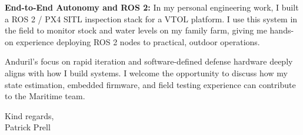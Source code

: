 \documentclass[localFont,alternative]{documentMETADATA}
\begin{document}
	\textbf{End-to-End Autonomy and ROS 2:} In my personal engineering work, I built a ROS 2 / PX4 SITL inspection stack for
	a VTOL platform. I use this system in the field to monitor stock and water levels on my family farm, giving me
	hands-on experience deploying ROS 2 nodes to practical, outdoor operations.

	Anduril's focus on rapid iteration and software-defined defense hardware deeply aligns with how I build systems.
	I welcome the opportunity to discuss how my state estimation, embedded firmware, and field testing experience can
	contribute to the Maritime team.

	\vspace{0.6em}

	Kind regards,\\[0.4em]
	Patrick Prell
\end{document}
